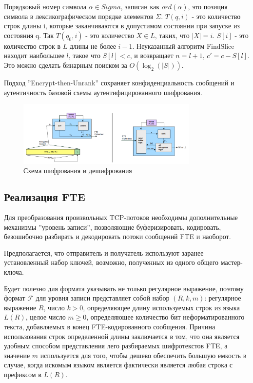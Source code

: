 Порядковый номер символа $\alpha \in Sigma$, записан как $ord(\alpha)$, это позиция символа в лексикографическом порядке элементов $\Sigma$.
$T(q, i)$ - это количество строк длины i, которые заканчиваются в допустимом состоянии при запуске из состояния q.
Так $T(q_0, i)$ - это количество $X \in L$, таких, что $|X| = i$.
$S[i]$ - это количество строк в $L$ длины не более $i - 1$.
Неуказанный алгоритм FindSlice находит наибольшее $l$, такое что $S[l] < c$, и возвращает $n = l + 1$, $c' = c - S[l]$.
Это можно сделать бинарным поиском за $O(\log_2(|S|))$.

Подход ''Encrypt-then-Unrank'' сохраняет конфиденциальность сообщений и аутентичность базовой схемы аутентифицированного шифрования.


\begin{figure}[h!]
    \begin{center}
        \includegraphics[width = 0.8\textwidth]{FTE_record_layer.png}
        \caption{Схема шифрования и дешифрования}
    \end{center}
\end{figure}

\subsection{Реализация FTE}

Для преобразования произвольных TCP-потоков необходимы дополнительные механизмы ''уровень записи'',
позволяющие буферизировать, кодировать, безошибочно разбирать и декодировать потоки сообщений FTE и наоборот.

Предполагается, что отправитель и получатель используют заранее установленный набор ключей, возможно, полученных из одного общего мастер-ключа.

Будет полезно для формата указывать не только регулярное выражение, поэтому формат $\mathcal{F}$ для уровня записи представляет собой набор $(R, k, m)$:
регулярное выражение $R$, число $k > 0$, определяющее длину используемых строк из языка $L(R)$,
целое число $m \geq 0$, определяющее количество бит неформатированного текста, добавляемых в конец FTE-кодированного сообщения.
Причина использования строк определенной длины заключается в том, что она является удобным способом представления лего разбираемых шифротекстов FTE,
а значение $m$ используется для того, чтобы дешево обеспечить большую емкость в случае,
когда искомым языком является фактически является любая строка с префиксом в $L(R)$.

